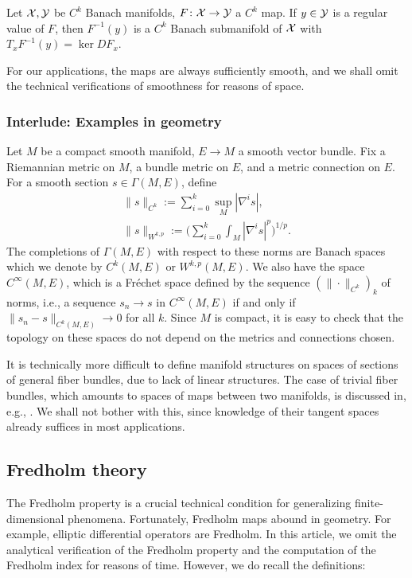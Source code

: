 \begin{theorem}
    Let ${\mathcal{X}}, {\mathcal{Y}}$ be $C^k$ Banach manifolds, 
	$F \colon {\mathcal{X}} \to {\mathcal{Y}}$ a $C^k$ map. 
	If $y \in {\mathcal{Y}}$ is a regular value of $F$, 
	then $F^{-1} (y)$ is a $C^k$ Banach submanifold of ${\mathcal{X}}$ 
	with $T_x F^{-1} (y) = \ker DF_x$.
\end{theorem}

For our applications, the maps are always sufficiently smooth, and 
we shall omit the technical verifications of smoothness for reasons of space.

\subsubsection{Interlude: Examples in geometry}
Let $M$ be a compact smooth manifold, 
$E \to M$ a smooth vector bundle. 
Fix a Riemannian metric on $M$, a bundle metric on $E$, 
and a metric connection on $E$. 
For a smooth section $s \in \Gamma (M, E)$, define
\begin{gather*}
    \|s\|_{C^k} := \sum _{i = 0} ^k \sup_M |\nabla^i s|, \\
    \|s\|_{W^{k, p}} 
		:= \Bigg( \sum _{i = 0} ^k \int_M |\nabla^i s|^p \Bigg) ^{1 / p}.
\end{gather*}
The completions of $\Gamma (M, E)$ with respect to these norms 
are Banach spaces which we denote by $C^k (M, E)$ or $W^{k, p} (M, E)$. 
We also have the space $C^\infty (M, E)$, which is a Fr{\'e}chet space 
defined by the sequence $( \mathclose{\|} \cdot \mathclose{\|} _{C^k} )_k$ 
of norms, i.e., a sequence $s_n \to s$ in $C^\infty (M, E)$ if and only if 
$\| s_n - s \|_{C^k (M, E)} \to 0$ for all $k$. 
Since $M$ is compact, it is easy to check that the topology 
on these spaces do not depend on the metrics and connections chosen.

It is technically more difficult to define manifold structures 
on spaces of sections of general fiber bundles, 
due to lack of linear structures. 
The case of trivial fiber bundles, which amounts to spaces of maps 
between two manifolds, is discussed in, e.g., \cite[Remark B.1.24]{MS}. 
We shall not bother with this, since knowledge of their tangent spaces 
already suffices in most applications.

\subsection{Fredholm theory}
The Fredholm property is a crucial technical condition 
for generalizing finite-dimensional phenomena. 
Fortunately, Fredholm maps abound in geometry. 
For example, elliptic differential operators are Fredholm. 
In this article, we omit the analytical verification of the Fredholm property 
and the computation of the Fredholm index for reasons of time. 
However, we do recall the definitions:

